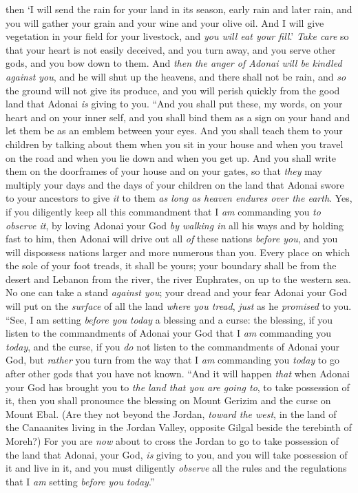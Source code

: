 \begin{biblechapter}
\verse then ‘I will send the rain for your land in its season, early rain and later rain, and you will gather your grain and your wine and your olive oil.
\verse And I will give vegetation in your field for your livestock, and \textit{you will eat your fill}.’
\verse \textit{Take care} so that your heart is not easily deceived, and you turn away, and you serve other gods, and you bow down to them.
\verse And \textit{then} \textit{the anger of Adonai will be kindled against you}, and he will shut up the heavens, and there shall not be rain, and \textit{so} the ground will not give its produce, and you will perish quickly from the good land that Adonai \textit{is} giving to you.
\verse “And you shall put these, my words, on your heart and on your inner self, and you shall bind them as a sign on your hand and let them be as an emblem between your eyes.
\verse And you shall teach them to your children by talking about them when you sit in your house and when you travel on the road and when you lie down and when you get up.
\verse And you shall write them on the doorframes of your house and on your gates,
\verse so that \textit{they} may multiply your days and the days of your children on the land that Adonai swore to your ancestors to give \textit{it} to them \textit{as long as heaven endures over the earth}.
\verse Yes, if you diligently keep all this commandment that I \textit{am} commanding you \textit{to observe it},  by loving Adonai your God \textit{by walking in} all his ways and by holding fast to him,
\verse then Adonai will drive out all \textit{of} these nations \textit{before you}, and you will dispossess nations larger and more numerous than you.
\verse Every place on which the sole of your foot treads, it shall be yours; your boundary shall be from the desert and Lebanon from the river, the river Euphrates, on up to the western sea.
\verse No one can take a stand \textit{against you}; your dread and your fear Adonai your God will put on the \textit{surface} of all the land \textit{where you tread}, \textit{just} as he \textit{promised} to you.
\verse “See, I am setting \textit{before you} \textit{today} a blessing and a curse:
\verse the blessing, if you listen to the commandments of Adonai your God that I \textit{am} commanding you \textit{today},
\verse and the curse, if you \textit{do} not listen to the commandments of Adonai your God, but \textit{rather} you turn from the way that I \textit{am} commanding you \textit{today} to go after other gods that you have not known.
\verse “And it will happen \textit{that} when Adonai your God has brought you to \textit{the land that you are going to}, to take possession of it, then you shall pronounce the blessing on Mount Gerizim and the curse on Mount Ebal.
\verse (Are they not beyond the Jordan, \textit{toward the west}, in the land of the Canaanites living in the Jordan Valley, opposite Gilgal beside the terebinth of Moreh?)
\verse For you are \textit{now} about to cross the Jordan to go to take possession of the land that Adonai, your God, \textit{is} giving to you, and you will take possession of it and live in it,
\verse and you must diligently \textit{observe} all the rules and the regulations that I \textit{am} setting \textit{before you} \textit{today}.”
\end{biblechapter}

